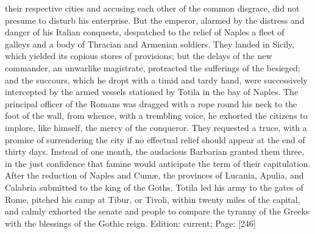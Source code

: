 their respective cities and accusing each other of the common disgrace, did not presume to disturb his enterprise. But the emperor, alarmed by the distress and danger of his Italian conquests, despatched to the relief of Naples a fleet of galleys and a body of Thracian and Armenian soldiers. They landed in Sicily, which yielded its copious stores of provisions; but the delays of the new commander, an unwarlike magistrate, protracted the sufferings of the besieged; and the succours, which he dropt with a timid and tardy hand, were successively intercepted by the armed vessels stationed by Totila in the bay of Naples. The principal officer of the Romans was dragged with a rope round his neck to the foot of the wall, from whence, with a trembling voice, he exhorted the citizens to implore, like himself, the mercy of the conqueror. They requested a truce, with a promise of surrendering the city if no effectual relief should appear at the end of thirty days. Instead of one month, the audacious Barbarian granted them three, in the just confidence that famine would anticipate the term of their capitulation. After the reduction of Naples and Cumæ, the provinces of Lucania, Apulia, and Calabria submitted to the king of the Goths. Totila led his army to the gates of Rome, pitched his camp at Tibur, or Tivoli, within twenty miles of the capital, and calmly exhorted the senate and people to compare the tyranny of the Greeks with the blessings of the Gothic reign.
Edition: current; Page: [246]

